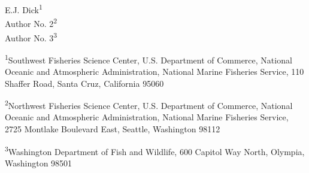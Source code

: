 
\begin{center}
\thispagestyle{empty}


\vspace{.5cm}




E.J. Dick\textsuperscript{1}\\
Author No. 2\textsuperscript{2}\\
Author No. 3\textsuperscript{3}\\

\vspace{.5cm}

\small
\textsuperscript{1}Southwest Fisheries Science Center, U.S. Department of Commerce, National Oceanic and Atmospheric Administration, National Marine Fisheries Service, 110 Shaffer Road, Santa Cruz, California 95060\\

\vspace{.3cm}

\textsuperscript{2}Northwest Fisheries Science Center, U.S. Department of Commerce, National Oceanic and Atmospheric Administration, National Marine Fisheries Service, 2725 Montlake Boulevard East, Seattle, Washington 98112\\

\vspace{.3cm}

\textsuperscript{3}Washington Department of Fish and Wildlife, 600 Capitol Way North, Olympia, Washington 98501\\

\vspace{.3cm}


\end{center}
